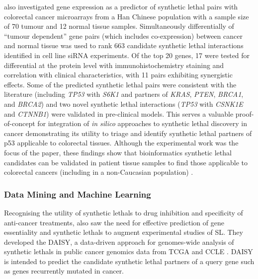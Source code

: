 \citet{Tiong2014} also investigated \gls{gene expression} as a predictor of \gls{synthetic lethal} pairs with colorectal cancer \glspl{microarray} from a Han Chinese population with a sample size of 70 tumour and 12 normal tissue samples. Simultaneously differentially  of ``tumour dependent'' gene pairs (which includes co-expression) between cancer and normal tissue was used to rank 663 candidate \gls{synthetic lethal} interactions identified in cell line \gls{siRNA} experiments. Of the top 20 genes, 17 were tested for differential  at the protein level with immunohistochemistry staining and correlation with clinical characteristics, with 11 pairs exhibiting synergistic effects. Some of the predicted \gls{synthetic lethal} pairs were consistent with the literature (including \textit{TP53} with \textit{S6K1} and partners of \textit{KRAS},  \textit{PTEN}, \textit{BRCA1}, and \textit{BRCA2}) and two novel \gls{synthetic lethal} interactions (\textit{TP53} with \textit{CSNK1E} and \textit{CTNNB1}) were validated in pre-clinical models. This serves a valuable proof-of-concept for integration of \textit{in silico} approaches to \gls{synthetic lethal} discovery in cancer demonstrating its utility to triage and identify \gls{synthetic lethal} partners of p53 applicable to colorectal tissues. Although the experimental work was the focus of the paper, these findings show that \gls{bioinformatics} \gls{synthetic lethal} candidates can be validated in patient tissue samples to find those applicable to colorectal cancers (including in a non-Caucasian population) .

\subsubsection{Data Mining and Machine Learning}


Recognising the utility of \glspl{synthetic lethal} to drug inhibition and specificity of anti-cancer \glspl{treatment}, \citet{Jerby2014} also saw the need for effective prediction of gene essentiality and \glspl{synthetic lethal} to augment experimental studies of SL. They developed the \gls{DAISY}, a data-driven approach for \glspl{genome}-wide analysis of \glspl{synthetic lethal} in public cancer \glspl{genomic} data from \gls{TCGA} and \gls{CCLE}  \citep{Barretina2012}. \gls{DAISY} is intended to predict the candidate \gls{synthetic lethal} partners of a query gene such as genes recurrently mutated in cancer.  


